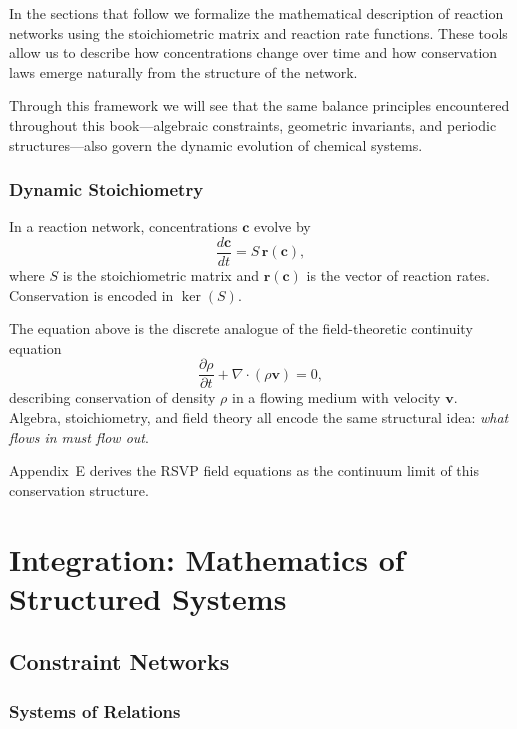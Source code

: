 \documentclass[11pt, openany]{book}
\theoremstyle{plain}
\theoremstyle{definition}
\theoremstyle{remark}
\newcommand{\pd}[2]{\frac{\partial #1}{\partial #2}}
\begin{document}
In the sections that follow we formalize the mathematical description of
reaction networks using the stoichiometric matrix and reaction rate
functions. These tools allow us to describe how concentrations change
over time and how conservation laws emerge naturally from the structure
of the network.

Through this framework we will see that the same balance principles
encountered throughout this book—algebraic constraints, geometric
invariants, and periodic structures—also govern the dynamic evolution of
chemical systems.

\section{Dynamic Stoichiometry}

In a reaction network, concentrations $\mathbf{c}$ evolve by
\[
  \frac{d\mathbf{c}}{dt} = S\,\mathbf{r}(\mathbf{c}),
\]
where $S$ is the stoichiometric matrix and $\mathbf{r}(\mathbf{c})$ is the
vector of reaction rates. Conservation is encoded in $\ker(S)$.

\begin{myexample}
The equation above is the discrete analogue of the field-theoretic continuity
equation
\[
  \pd{\rho}{t} + \nabla\cdot(\rho\mathbf{v}) = 0,
\]
describing conservation of density $\rho$ in a flowing medium with velocity
$\mathbf{v}$. Algebra, stoichiometry, and field theory all encode the same
structural idea: \emph{what flows in must flow out}.
\end{myexample}

\begin{deepnote}
Appendix~E derives the RSVP field equations as the continuum limit of this
conservation structure.
\end{deepnote}

\part{Integration: Mathematics of Structured Systems}

\chapter{Constraint Networks}

\section*{Systems of Relations}
\end{document}
